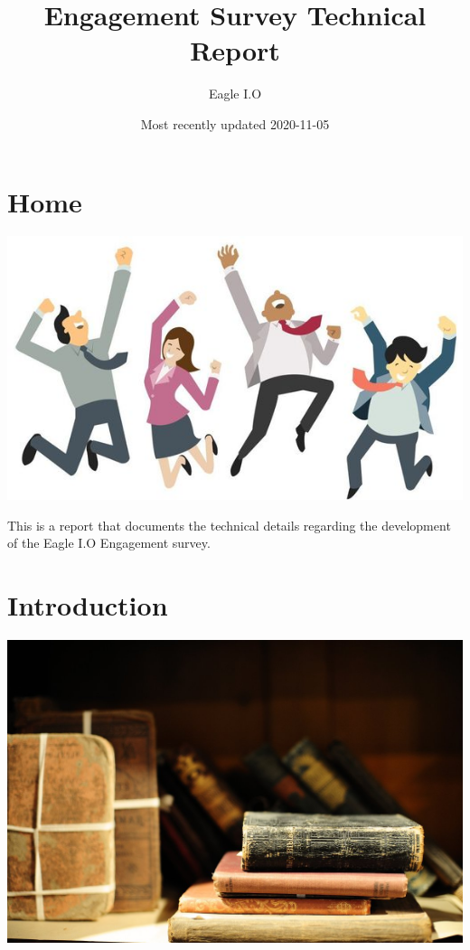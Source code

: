 \documentclass[
]{book}
\title{Engagement Survey Technical Report}
\author{Eagle I.O}
\date{Most recently updated 2020-11-05}
\begin{document}
\maketitle

{
\setcounter{tocdepth}{4}
\tableofcontents
}
\hypertarget{homepage}{%
\chapter{Home}\label{homepage}}

\includegraphics{EE.jpeg}

This is a report that documents the technical details regarding the development of the Eagle I.O Engagement survey.

\hypertarget{intro}{%
\chapter{Introduction}\label{intro}}

\includegraphics{research.jpg}
\end{document}
